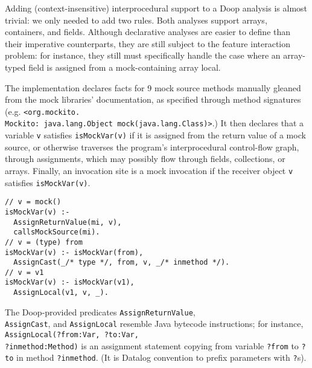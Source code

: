 
Adding (context-insensitive) interprocedural support to a Doop analysis is almost trivial: we only needed to add two rules.
Both analyses support arrays, containers, and fields. Although declarative analyses are easier to define than their imperative counterparts, they are still subject to the feature interaction problem: for instance, they still must specifically handle the case where an array-typed field is assigned from a mock-containing array local.

The implementation declares facts for 9 mock source methods manually gleaned from the mock libraries' documentation, as specified through method signatures (e.g. 
\texttt{<org.mockito.\\Mockito: java.lang.Object mock(java.lang.Class)>}.)
It then declares that a variable {\tt v} satisfies \verb+isMockVar(v)+ if it is assigned from the return value of a mock source, or otherwise traverses the program's interprocedural control-flow graph, through assignments, which may possibly flow through fields, collections, or arrays. Finally, an invocation site is a mock invocation if the receiver object {\tt v} satisfies \verb+isMockVar(v)+.

\begin{lstlisting}[basicstyle=\ttfamily\small,numbers=none,label={lst:core},caption={Selected rules for Datalog mock analysis}]
// v = mock()
isMockVar(v) :-
  AssignReturnValue(mi, v),
  callsMockSource(mi).
// v = (type) from
isMockVar(v) :- isMockVar(from),
  AssignCast(_/* type */, from, v, _/* inmethod */).
// v = v1
isMockVar(v) :- isMockVar(v1),
  AssignLocal(v1, v, _).
\end{lstlisting}

The Doop-provided predicates \texttt{AssignReturnValue}, \\\texttt{AssignCast}, and \texttt{AssignLocal} resemble Java bytecode instructions; for instance, \texttt{AssignLocal(?from:Var, ?to:Var, \\?inmethod:Method)} is an assignment statement copying from variable \texttt{?from} to \texttt{?to} in method \texttt{?inmethod}. (It is Datalog convention to prefix parameters with \texttt{?}s).

